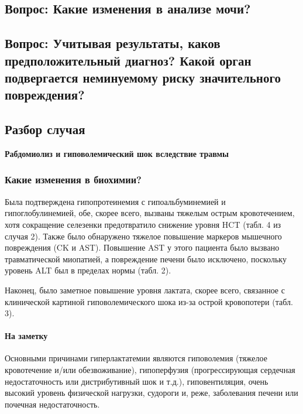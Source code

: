 \documentclass[a4paper,12pt]{book}
\begin{document}
\subsection*{Вопрос: Какие изменения в анализе мочи?}
\subsection*{Вопрос: Учитывая результаты, каков предположительный диагноз? Какой орган подвергается неминуемому риску значительного повреждения?}

\subsection*{Разбор случая}
\textbf{Рабдомиолиз и гиповолемический шок вследствие травмы}

\subsubsection*{Какие изменения в биохимии?}
Была подтверждена гипопротеинемия с гипоальбуминемией и гипоглобулинемией, обе, скорее всего, вызваны тяжелым острым кровотечением, хотя сокращение селезенки предотвратило снижение уровня HCT (табл. 4 из случая 2). Также было обнаружено тяжелое повышение маркеров мышечного повреждения (CK и AST). Повышение AST у этого пациента было вызвано травматической миопатией, а повреждение печени было исключено, поскольку уровень ALT был в пределах нормы (табл. 2).

Наконец, было заметное повышение уровня лактата, скорее всего, связанное с клинической картиной гиповолемического шока из-за острой кровопотери (табл. 3).

\paragraph{На заметку}
Основными причинами гиперлактатемии являются гиповолемия (тяжелое кровотечение и/или обезвоживание), гипоперфузия (прогрессирующая сердечная недостаточность или дистрибутивный шок и т.д.), гиповентиляция, очень высокий уровень физической нагрузки, судороги и, реже, заболевания печени или почечная недостаточность.
\end{document}
